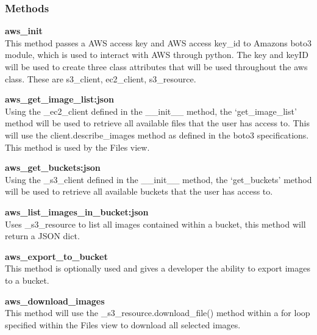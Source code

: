 \subsubsection{Methods}
\textbf{aws\_init} \\
    This method passes a AWS access key and AWS access key\_id to Amazons boto3 module, which is used to interact with AWS through python. The key 
    and keyID will be used to create three class attributes that will be used throughout the aws class. These are s3\_client, ec2\_client, s3\_resource.
    
\textbf{aws\_get\_image\_list:json} \\
    Using the \_ec2\_client defined in the \_\_init\_\_ method, the `get\_image\_list' method will be used to retrieve all available files that the user 
    has access to. This will use the client.describe\_images method as defined in the boto3 specifications. This method is used by the Files view.

\textbf{aws\_get\_buckets:json} \\
    Using the \_s3\_client defined in the \_\_init\_\_  method, the `get\_buckets' method will be used to retrieve all available buckets that the user 
    has access to.

\textbf{aws\_list\_images\_in\_bucket:json} \\
    Uses \_s3\_resource to list all images contained within a bucket, this method will return a JSON dict.

\textbf{aws\_export\_to\_bucket} \\
    This method is optionally used and gives a developer the ability to export images to a bucket.

\textbf{aws\_download\_images} \\
    This method will use the \_s3\_resource.download\_file() method within a for loop specified within the Files view to download all selected images.

